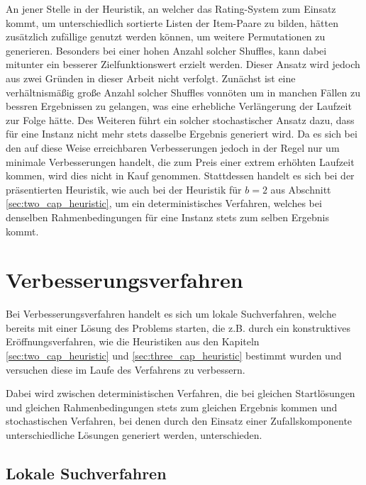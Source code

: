 
An jener Stelle in der Heuristik, an welcher das Rating-System zum Einsatz kommt, um unterschiedlich sortierte
Listen der Item-Paare zu bilden, hätten zusätzlich zufällige  genutzt werden können,
um weitere Permutationen zu generieren. Besonders bei einer hohen Anzahl solcher Shuffles,
kann dabei mitunter ein besserer Zielfunktionswert erzielt werden. Dieser Ansatz wird jedoch aus zwei Gründen in
dieser Arbeit nicht verfolgt. Zunächst ist eine verhältnismäßig große Anzahl solcher Shuffles vonnöten um in
manchen Fällen zu bessren Ergebnissen zu gelangen, was eine erhebliche Verlängerung der Laufzeit zur Folge hätte.
Des Weiteren führt ein solcher stochastischer Ansatz dazu, dass für eine Instanz nicht mehr stets dasselbe Ergebnis
generiert wird. Da es sich bei den auf diese Weise erreichbaren Verbesserungen jedoch in der Regel nur um minimale
Verbesserungen handelt, die zum Preis einer extrem erhöhten Laufzeit kommen, wird dies nicht in Kauf genommen.
Stattdessen handelt es sich bei der präsentierten Heuristik, wie auch bei der Heuristik für $b = 2$ aus Abschnitt
\ref{sec:two_cap_heuristic}, um ein deterministisches Verfahren, welches bei denselben Rahmenbedingungen für eine Instanz
stets zum selben Ergebnis kommt.

\section{Verbesserungsverfahren}
\label{sec:post_optimization}

Bei Verbesserungsverfahren handelt es sich um lokale Suchverfahren, welche bereits mit einer Lösung des Problems starten,
die z.B. durch ein konstruktives Eröffnungsverfahren, wie die Heuristiken aus den Kapiteln \ref{sec:two_cap_heuristic} und \ref{sec:three_cap_heuristic} bestimmt wurden und versuchen diese im Laufe des Verfahrens zu verbessern.

Dabei wird zwischen deterministischen Verfahren, die bei gleichen Startlösungen und gleichen Rahmenbedingungen stets zum gleichen
Ergebnis kommen und stochastischen Verfahren, bei denen durch den Einsatz einer Zufallskomponente unterschiedliche Lösungen
generiert werden, unterschieden. \cite{Knust2017}

\subsection{Lokale Suchverfahren}
\label{sec:local_search}

